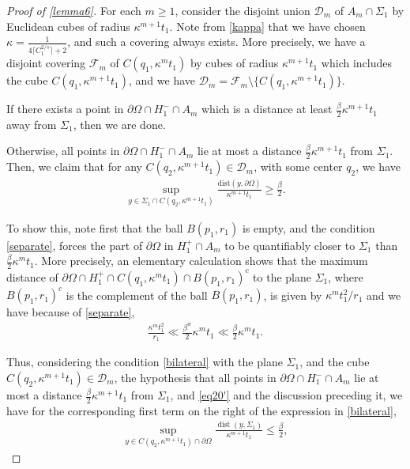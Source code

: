 \documentclass{article}
\newcounter{lem}
\theoremstyle{plain}
\theoremstyle{plain}
\theoremstyle{definition}
\theoremstyle{plain}
\begin{document}
\begin{proof}[Proof of \cref{lemma6}]
For each $m\geq 1$, consider the disjoint union $\mathcal{D}_m$ of $A_m\cap \Sigma_1 $ by Euclidean cubes of radius $ \kappa^{m+1} t_1$. Note from \cref{kappa} that we have chosen $\kappa=\frac{1}{4\lceil C_{1}^{2/s}\rceil+2}$, and such a covering always exists. More precisely, we have a disjoint covering $\mathcal{F}_m$ of $C(q_1,\kappa^m t_1)$ by cubes of radius $ \kappa^{m+1} t_1$ which includes the cube $C(q_1,\kappa^{m+1}t_1)$, and we have $\mathcal{D}_m=\mathcal{F}_m\setminus \{C(q_1,\kappa^{m+1}t_1)\}$.

If there exists a point in $\partial\Omega\cap H^{-}_{1}\cap A_m$ which is a distance at least $\frac{\beta}{2} \kappa^{m+1} t_1$ away from $\Sigma_1$, then we are done.
    
    Otherwise, all points in $\partial\Omega\cap H^{-}_{1}\cap A_m$ lie at most a distance $\frac{\beta}{2} \kappa^{m+1} t_1$ from $\Sigma_1$. Then, we claim that for any $C(q_2,\kappa^{m+1} t_1)\in \mathcal{D}_m$, with some center $q_2$, we have
    \begin{align}\label{eq11}
        \sup\limits_{y\in \Sigma_1 \cap C(q_2,\kappa^{m+1} t_1 ) }\frac{\text{dist}(y,\partial\Omega)}{\kappa^{m+1} t_1} \geq \frac{\beta}{2}.
    \end{align}

    To show this, note first that the ball $B(p_1,r_1)$ is empty, and the condition \cref{separate}, forces the part of $\partial\Omega$ in $H^{+}_{1}\cap A_m$ to be quantifiably closer to $\Sigma_1$ than $\frac{\beta}{2}\kappa^{m} t_1$. More precisely, an elementary calculation shows that the maximum distance of $\partial\Omega\cap H^{+}_1 \cap C(q_1,\kappa^m t_1)\cap B
    (p_1,r_1)^c$ to the plane $\Sigma_1$, where $B(p_1,r_1)^c$  is the complement of the ball $B(p_1,r_1)$, is given by $\kappa^m t_{1}^{2}/r_1$ and we have because of \cref{separate}, 
    \begin{align}\label{eq20'}
    \frac{\kappa^m t_{1}^2}{r_1}\ll \frac{\beta^w}{2} \kappa^m t_1  \ll \frac{\beta}{2} \kappa^m t_1.
    \end{align}

Thus, considering the condition \cref{bilateral} with the plane $\Sigma_1$, and the cube $C(q_2,\kappa^{m+1} t_1)\in \mathcal{D}_m$, the hypothesis that all points in $\partial\Omega\cap H^{-}_{1}\cap A_m$ lie at most a distance $\frac{\beta}{2} \kappa^{m+1} t_1$ from $\Sigma_1$, and \cref{eq20'} and the discussion preceding it, we have for the corresponding first term on the right of the expression in \cref{bilateral}, 
\begin{align}
    \sup_{y \in C(q_2,\kappa^{m+1} t_1)\cap \partial \Omega} \frac{\operatorname{dist}(y,\Sigma_1)}{\kappa^{m+1} t_1}\leq  \frac{\beta}{2},
\end{align}


\end{proof}
\end{document}
